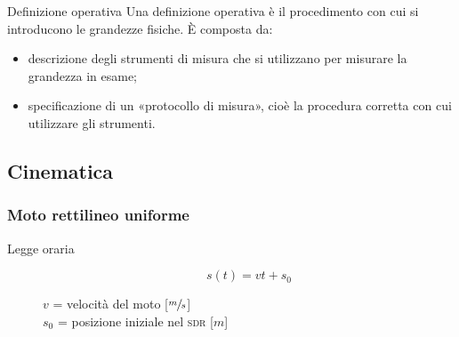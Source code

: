 \documentclass[a4paper,11pt,italian]{article}
\begin{document}
\begin{description}
\begin{soloscientifico} %
  \item[Definizione operativa] 
  Una definizione operativa è il procedimento con cui si introducono le grandezze fisiche. È composta da:
  \begin{itemize}
    \item descrizione degli strumenti di misura che si utilizzano per misurare la grandezza in esame; 
    \item specificazione di un «protocollo di misura», cioè la procedura corretta con cui utilizzare gli strumenti.
  \end{itemize}
\end{soloscientifico}   %
\end{description}



\subsection{Cinematica}\label{sec:cinematica}
\subsubsection{Moto rettilineo uniforme}
\begin{description}
  \item[Legge oraria] 
  \[ s(t) = v  t + s_0 \]
  \begin{multicols}{2}
  $ v $ = velocità del moto [$ \sfrac{m}{s} $]\\
  $ s_0 $ = posizione iniziale nel \textsc{sdr} [$ m $]
  \end{multicols}
\end{description}
\end{document}
